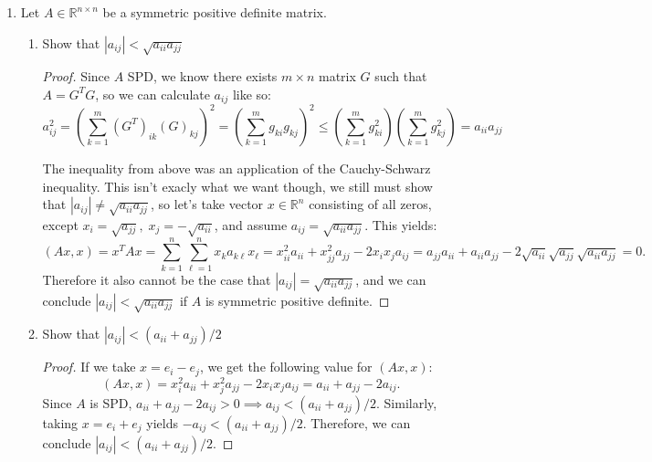 \documentclass[11pt]{article}
\newcommand{\R}{\mathbb{R}}
\begin{document}
\begin{enumerate}
	\item Let \(A \in \R^{n \times n}\) be a symmetric positive definite matrix.
	      \begin{enumerate}
		      \item Show that \(|a_{ij}| < \sqrt{a_{ii}a_{jj}}\)
            \begin{proof}
              Since \(A\) SPD, we know there exists \(m \times n\) matrix \(G\) such that \(A = G^T G\), so we can calculate \(a_{ij}\) like so:
              \[a_{ij}^2 = \left( \sum_{k=1}^m (G^T)_{ik}(G)_{kj} \right)^2 = \left( \sum_{k=1}^m g_{ki}g_{kj} \right)^2 \leq \left( \sum_{k=1}^m g_{ki}^2 \right) \left( \sum_{k=1}^m g_{kj}^2 \right) = a_{ii}a_{jj} \]
              
              The inequality from above was an application of the Cauchy-Schwarz inequality.  This isn't exacly what we want though, we still must show that \(|a_{ij}| \neq \sqrt{a_{ii}a_{jj}}\), so let's take vector \(x \in \R^n\) consisting of all zeros, except \(x_i = \sqrt{a_{jj}}, \; x_j = -\sqrt{a_{ii}}\), and assume \(a_{ij} = \sqrt{a_{ii}a_{jj}}\).  This yields:
              \[(Ax,x) = x^T A x = \textstyle\sum\limits_{k=1}^n \textstyle\sum\limits_{\ell=1}^n x_k a_{k \ell} x_\ell = x_{ii}^2a_{ii} + x_{jj}^2a_{jj} - 2x_ix_ja_{ij} = a_{jj}a_{ii} + a_{ii}a_{jj} - 2\sqrt{a_{ii}}\sqrt{a_{jj}}\sqrt{a_{ii}a_{jj}} = 0.\]
              Therefore it also cannot be the case that \(|a_{ij}| = \sqrt{a_{ii}a_{jj}}\), and we can conclude \(|a_{ij}| < \sqrt{a_{ii}a_{jj}}\) if \(A\) is symmetric positive definite.
            \end{proof}

		      \item Show that \(|a_{ij}| < (a_{ii}+a_{jj})/2\)
            \begin{proof}
              If we take \(x = e_i - e_j\), we get the following value for \((Ax,x)\):
                \[(Ax,x) = x_i^2a_{ii} + x_j^2a_{jj} - 2x_ix_ja_{ij} = a_{ii} + a_{jj} - 2a_{ij}.\]
              Since \(A\) is SPD, \(a_{ii} + a_{jj} - 2a_{ij} > 0 \implies a_{ij} < (a_{ii}+a_{jj})/2\).  Similarly, taking \(x = e_i + e_j\) yields \(-a_{ij} < (a_{ii}+a_{jj})/2\).  Therefore, we can conclude \(|a_{ij}| < (a_{ii}+a_{jj})/2\).
            \end{proof}
	      \end{enumerate}


\end{enumerate}
\end{document}
